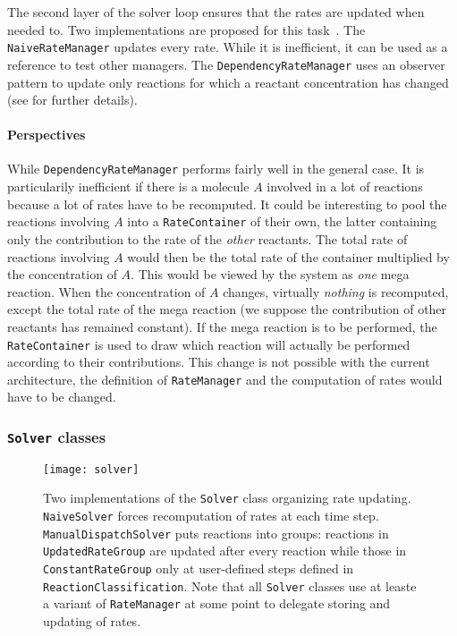 The second layer of the solver loop ensures that the rates are updated when needed to. Two implementations are proposed for this task~. The \texttt{NaiveRateManager} updates every rate. While it is inefficient, it can be used as a reference to test other managers. The \texttt{DependencyRateManager} uses an observer pattern to update only reactions for which a reactant concentration has changed (see \citet{cati} for further details).

\paragraph{Perspectives} While \texttt{DependencyRateManager} performs fairly well in the general case. It is particularily inefficient if there is a molecule $A$ involved in a lot of reactions because a lot of rates have to be recomputed. It could be interesting to pool the reactions involving $A$ into a \texttt{RateContainer} of their own, the latter containing only the contribution to the rate of the \emph{other} reactants. The total rate of reactions involving $A$ would then be the total rate of the container multiplied by the concentration of $A$. This would be viewed by the system as \emph{one} mega reaction. When the concentration of $A$ changes, virtually \emph{nothing} is recomputed, except the total rate of the mega reaction (we suppose the contribution of other reactants has remained constant). If the mega reaction is to be performed, the \texttt{RateContainer} is used to draw which reaction will actually be performed according to their contributions. This change is not possible with the current architecture, the definition of \texttt{RateManager} and the computation of rates would have to be changed.

\subsubsection{\texttt{Solver} classes}

\begin{figure}[!h]
  \centering
  \texttt{[image: solver]}
  \caption{Two implementations of the \texttt{Solver} class organizing rate updating. \texttt{NaiveSolver} forces recomputation of rates at each time step. \texttt{ManualDispatchSolver} puts reactions into groups: reactions in \texttt{UpdatedRateGroup} are updated after every reaction while those in \texttt{ConstantRateGroup} only at user-defined steps defined in \texttt{ReactionClassification}. Note that all \texttt{Solver} classes use at leaste a variant of \texttt{RateManager} at some point to delegate storing and updating of rates.}
  \label{fig:solver_details}
\end{figure}

